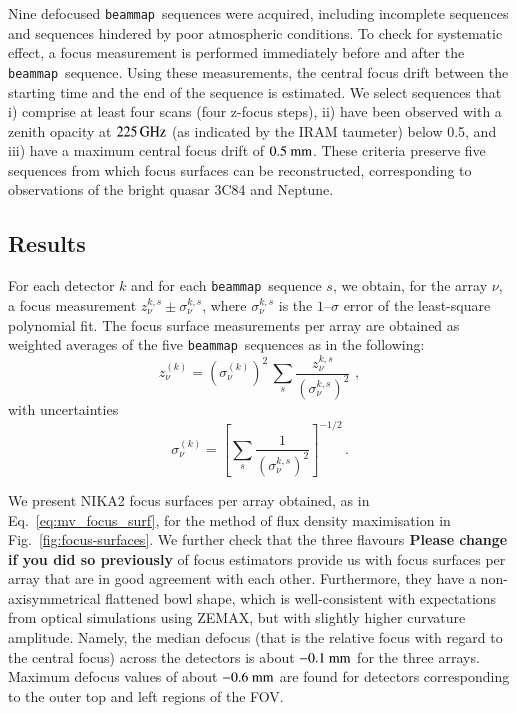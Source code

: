 \documentclass[traditionalabstract]{aa}
\newcommand{\bm}{{\tt beammap}}
\newcommand{\taumeter}{taumeter}
\newcommand{\LEt}[1]{{\bf {\color[RGB]{0, 153, 255} #1}}}
\begin{document}
{\begin{appendix}
Nine defocused \bm\ sequences were acquired, including incomplete
sequences and sequences hindered by poor atmospheric conditions. To
check for systematic effect, a focus measurement is performed
immediately before and after the \bm\ sequence. Using these
measurements, the central focus drift between the starting time and the
end of the sequence is estimated. 
We select sequences that i) comprise at least four scans (four
z-focus steps), ii) have been observed with a zenith opacity at $225\,\rm{GHz}$ (as indicated by
the IRAM \taumeter) below 0.5, and iii) have a maximum central focus
drift of $0.5~\rm{mm}$. These criteria preserve five sequences from which focus
surfaces can be reconstructed, %
corresponding to observations of the bright quasar 3C84 and Neptune.

\subsection{Results}
For each detector $k$ and for each \bm\ sequence $s$, we obtain, for
the array $\nu$, a focus measurement $z_\nu^{k, s} \pm \sigma_\nu^{k, s}$,
where $\sigma_\nu^{k, s}$ is the $1\mbox{--}\sigma$ error of the least-square
polynomial fit. The focus surface measurements per array are obtained
as weighted averages of the five \bm\ sequences as in the
following:
%
\begin{equation}
\label{eq:mv_focus_surf}
z_\nu^{(k)} = \left( \sigma_\nu^{(k)} \right)^2 \,  \sum_s \frac{z_\nu^{k,s}}{\left(\sigma_\nu^{k,s}\right)^2}\, \,  ,
\end{equation}
with uncertainties 
\begin{equation}
\label{eq:error_mv_focus_surf}
\sigma_\nu^{(k)} = \left[ \sum_s \frac{1}{\left(\sigma_\nu^{k,s}\right)^2}\right]^{-1/2}\, .
\end{equation}


We present NIKA2 focus surfaces per array obtained, as in
Eq.~\ref{eq:mv_focus_surf}, for the method of flux density maximisation  
in Fig.~\ref{fig:focus-surfaces}.
We further check that the three flavours\LEt{Please change if you did so previously} of focus estimators provide
us with focus surfaces per array that are in good agreement with each
other. Furthermore, they have a non-axisymmetrical flattened bowl
shape, which is well-consistent with expectations from optical
simulations using ZEMAX, but with slightly higher curvature amplitude.
Namely, the median defocus (that is the relative focus with regard to the
central focus) across the detectors is about
$-0.1~\rm{mm}$ for the three arrays. Maximum defocus values of about
$-0.6~\rm{mm}$ are found for detectors corresponding to the outer top and
left regions of the FOV.


\end{appendix}}
\end{document}
